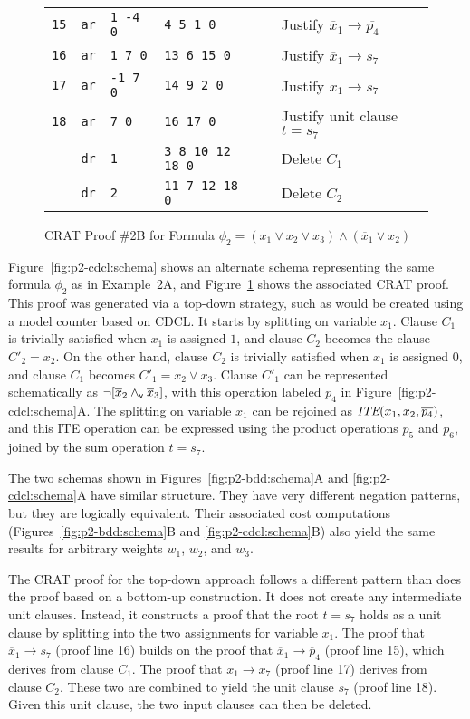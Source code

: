 \documentclass{llncs}
\newcommand{\pand}{\mathbin{\land_{\sf v}}}
\newcommand{\tautology}{1}
\newcommand{\nil}{0}
\newcommand{\obar}[1]{\overline{#1}}
\newcommand{\ite}{\mbox{\it ITE}}
\begin{document}
\begin{figure}
{\begin{tabular}{llllll}
    {\tt 15} & {\tt ar}  & {\tt 1 -4 0}    & {\tt 4 5 1 0} & & Justify $\obar{x}_1 \rightarrow \obar{p_4}$ \\
    {\tt 16} & {\tt ar}  & {\tt 1 7 0}     & {\tt 13 6 15 0} & & Justify $\obar{x}_1 \rightarrow s_7$ \\
    {\tt 17} & {\tt ar}  & {\tt -1 7 0}    & {\tt 14 9 2 0} & & Justify $x_1 \rightarrow s_7$ \\
    {\tt 18} & {\tt ar}  & {\tt 7 0}       & {\tt 16 17 0}  & & Justify unit clause $t = s_7$ \\
             & {\tt dr}  & {\tt 1}         & {\tt 3 8 10 12 18 0} & & Delete $C_1$\\
             & {\tt dr}  & {\tt 2}         & {\tt 11 7 12 18 0} & & Delete $C_2$\\
  \end{tabular}
}  
  \caption{CRAT Proof \#2B for Formula $\phi_2 = (x_1 \lor x_2 \lor x_3) \land (\obar{x}_1 \lor x_2)$}
  \label{fig:p2-cdcl:crat}
\end{figure}

Figure~\ref{fig:p2-cdcl:schema} shows an alternate schema representing
the same formula $\phi_2$ as in Example~2A, and
Figure~\ref{fig:p2-cdcl:crat} shows the associated CRAT proof.  This
proof was generated via a top-down strategy, such as would be created
using a model counter based on CDCL\@.  It starts by splitting on
variable $x_1$.  Clause $C_1$ is trivially satisfied when $x_1$ is
assigned $\tautology$, and clause $C_2$ becomes the clause $C'_2 =
x_2$.  On the other hand, clause $C_2$ is trivially satisfied when
$x_1$ is assigned $\nil$, and clause $C_1$ becomes $C'_1 = x_2 \lor
x_3$.  Clause $C'_1$ can be represented schematically as
$\neg[\obar{x}_2 \pand \obar{x}_3]$, with this operation labeled $p_4$
in Figure~\ref{fig:p2-cdcl:schema}A\@.  The splitting on variable
$x_1$ can be rejoined as $\ite(x_1, x_2, \obar{p_4})$, and this ITE
operation can be expressed using the product operations $p_5$ and
$p_6$, joined by the sum operation $t = s_7$.

The two schemas shown in Figures~\ref{fig:p2-bdd:schema}A and
\ref{fig:p2-cdcl:schema}A have similar structure.  They have very
different negation patterns, but they are logically equivalent.  Their
associated cost computations (Figures~\ref{fig:p2-bdd:schema}B and
\ref{fig:p2-cdcl:schema}B) also yield the same results for arbitrary
weights $w_1$, $w_2$, and $w_3$.

The CRAT proof for the top-down approach follows a different pattern than does the proof based on a bottom-up construction.
It does
not create any intermediate unit clauses.  Instead, it constructs a proof
that the root $t = s_7$ holds as a unit clause by splitting into the
two assignments for variable $x_1$.  The proof that
$\obar{x}_1 \rightarrow s_7$ (proof line 16) builds on the proof that
$\obar{x}_1 \rightarrow \obar{p}_4$ (proof line 15), which derives from clause $C_1$.
The proof that $x_1 \rightarrow x_7$ (proof line 17) derives from clause $C_2$.
These two are combined to yield the unit clause $s_7$ (proof line 18).
Given this unit clause, the two input clauses can then be deleted.
\end{document}
